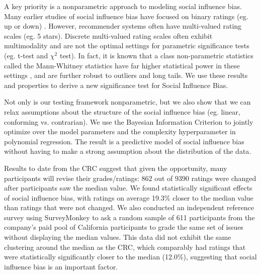 \vspace{1em}

A key priority is a nonparametric approach to modeling 
social influence bias. Many earlier studies of social influence
bias have focused on binary ratings (eg. up or down) \cite{muchnik2013social, zhu2012switch}.  
However, recommender systems often have multi-valued rating scales (eg. 5 stars).
Discrete multi-valued rating scales often exhibit multimodality and are not the optimal 
settings for parametric significance tests (eg. t-test and $\chi^2$ test).
In fact, it is known that a class non-parametric statistics called the Mann-Whitney statistics 
have far higher statistical power in these settings \cite{lehmann2006nonparametrics}, and
are further robust to outliers and long tails.
We use these results and properties to derive a new significance test for Social Influence Bias.

Not only is our testing framework nonparametric, but we also show that
we can relax assumptions about the structure of the social influence bias (eg. linear, conforming vs. contrarian).
We use the Bayesian Information Criterion to jointly optimize over the model parameters and the complexity hyperparameter in polynomial regression.
The result is a predictive model of social influence bias without having to make a strong assumption 
about the distribution of the data.



Results to date from the CRC suggest that given the opportunity, many
participants will revise their grades/ratings: $862$ out of $9390$
ratings were changed after participants saw the median value.  We
found statistically significant effects of social influence bias, with
ratings on average 19.3\% closer to the median value than ratings that
were not changed.  We also conducted an independent reference survey
using SurveyMonkey to ask a random sample of 611 participants from the
company's paid pool of California participants to grade the same set
of issues without displaying the median values.  This data did not
exhibit the same clustering around the median as the CRC, which
comparably had ratings that were statistically significantly closer to
the median (12.0\%), suggesting that social influence bias is an
important factor.


